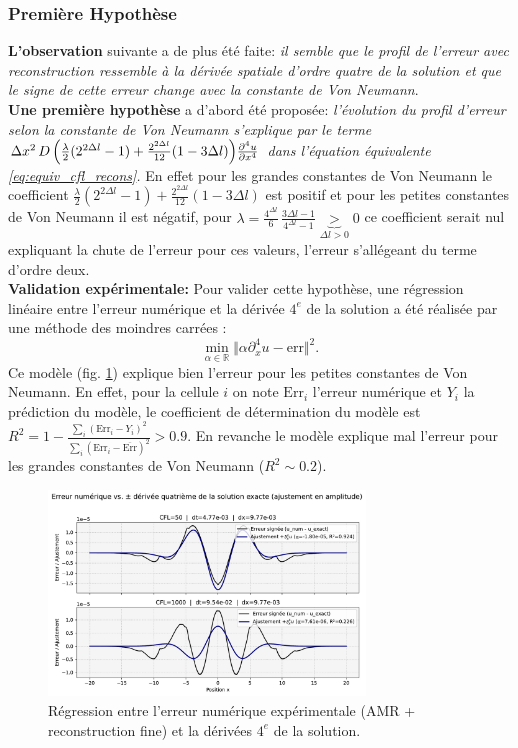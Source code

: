 \subsubsection{Première Hypothèse}
\textbf{L'observation} suivante a de plus été faite: \textit{il semble que le profil de l'erreur avec reconstruction ressemble à la dérivée spatiale d'ordre quatre
de la solution et que le signe de cette erreur change avec la constante de Von Neumann}.\\
\textbf{Une première hypothèse} a d'abord été proposée: \textit{l'évolution du profil d'erreur selon la constante de Von Neumann s'explique par le terme $\Delta x^{2}\, D \, \Bigl( 
        \frac{\lambda}{2} (2^{2 \Delta l} - 1) + \frac{2^{2 \Delta l} }{12} (1 - 3 \Delta l)
        \Bigr)\frac{\partial^{4}u}{\partial x^{4}}$ dans l'équation équivalente \eqref{eq:equiv_cfl_recons}.}
En effet pour les grandes constantes de Von Neumann le coefficient $\frac{\lambda}{2} (2^{2 \Delta l} - 1) + \frac{2^{2 \Delta l} }{12} (1 - 3 \Delta l)$ est positif et pour les petites constantes de Von Neumann il est négatif, pour $\lambda = \frac{4^{\Delta l}}{6}\,\frac{3 \Delta l - 1 }{4^{\Delta l}-1} \underbrace{>}_{\Delta l >0} 0$ ce coefficient serait nul expliquant 
la chute de l'erreur pour ces valeurs, l'erreur s'allégeant du terme d'ordre deux.\\
\textbf{Validation expérimentale:} Pour valider cette hypothèse, une régression linéaire entre l'erreur numérique et la dérivée $4^e$ de la solution a été réalisée par 
une méthode des moindres carrées : $$\min_{\alpha \in \mathbb R} \Vert \alpha \partial_x^4 u - \text{err} \Vert^2.$$
Ce modèle (fig. \ref{fig:derive4_vs_err}) explique bien l'erreur pour les petites constantes de Von Neumann. En effet, pour la cellule $i$ on note $\mathrm{Err}_i$ l'erreur numérique et $Y_i$ la prédiction du modèle, 
le coefficient de détermination du modèle est $R^2 = 1 -  \frac{\sum_i (\mathrm{Err}_i - Y_i)^2 }{\sum_i (\mathrm{Err}_i - \overline{\mathrm{Err}})^2}>0.9$. En revanche le modèle explique mal l'erreur pour les grandes constantes de Von Neumann ($R^2 \sim 0.2$).
\begin{figure}[htpb]
    \centering
    \includegraphics[width=0.75\textwidth]{media/4_travail/3/erreur_vs_deriv4.pdf}
    \caption{Régression entre l'erreur numérique expérimentale (AMR + reconstruction fine) et la dérivées $4^e$ de la solution.}
    \label{fig:derive4_vs_err}
\end{figure}
\newpage
